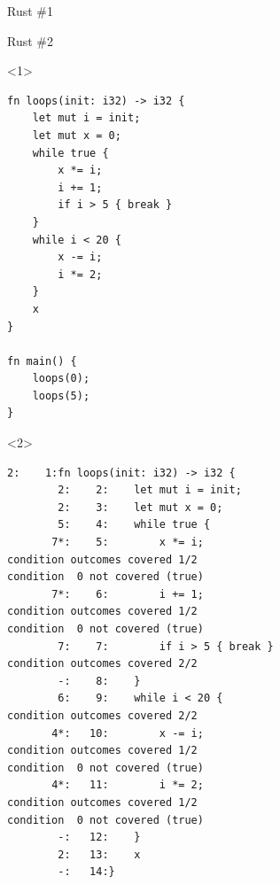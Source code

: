\documentclass[xcolor = {dvipsnames, table}, aspectratio=169]{beamer}
\begin{document}
\begin{frame}[fragile, t]
\begin{block}{Rust \#1}
\begin{onlyenv}
        \end{onlyenv}
    \end{block}
\end{frame}

\begin{frame}[fragile, t]
    \begin{block}{Rust \#2}
        \begin{onlyenv}<1>
            \begin{lstlisting}[basicstyle = \scriptsize\ttfamily]
fn loops(init: i32) -> i32 {
    let mut i = init;
    let mut x = 0;
    while true {
        x *= i;
        i += 1;
        if i > 5 { break }
    }
    while i < 20 {
        x -= i;
        i *= 2;
    }
    x
}

fn main() {
    loops(0);
    loops(5);
}
            \end{lstlisting}
        \end{onlyenv}

        \begin{onlyenv}<2>
            \begin{lstlisting}[basicstyle = \tiny\ttfamily]
        2:    1:fn loops(init: i32) -> i32 {
        2:    2:    let mut i = init;
        2:    3:    let mut x = 0;
        5:    4:    while true {
       7*:    5:        x *= i;
condition outcomes covered 1/2
condition  0 not covered (true)
       7*:    6:        i += 1;
condition outcomes covered 1/2
condition  0 not covered (true)
        7:    7:        if i > 5 { break }
condition outcomes covered 2/2
        -:    8:    }
        6:    9:    while i < 20 {
condition outcomes covered 2/2
       4*:   10:        x -= i;
condition outcomes covered 1/2
condition  0 not covered (true)
       4*:   11:        i *= 2;
condition outcomes covered 1/2
condition  0 not covered (true)
        -:   12:    }
        2:   13:    x
        -:   14:}
            \end{lstlisting}
        \end{onlyenv}
    \end{block}
\end{frame}
\end{document}
